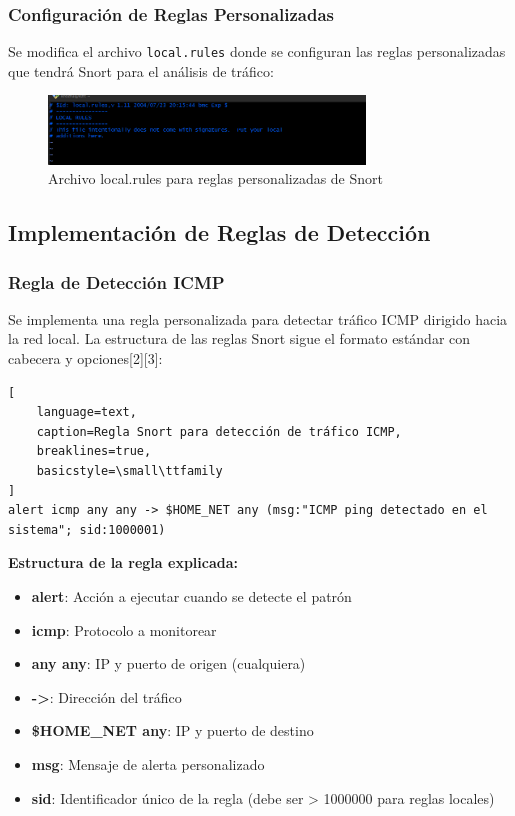 \documentclass[12pt,a4paper]{article}
\begin{document}
\subsubsection{Configuración de Reglas Personalizadas}

Se modifica el archivo \texttt{local.rules} donde se configuran las reglas
personalizadas que tendrá Snort para el análisis de tráfico:

\begin{figure}[H]
  \centering
  \includegraphics[width=0.75\textwidth]{./assets/img14.png}
  \caption{Archivo local.rules para reglas personalizadas de Snort}
  \label{fig:local-rules}
\end{figure}

\subsection{Implementación de Reglas de Detección}

\subsubsection{Regla de Detección ICMP}

Se implementa una regla personalizada para detectar tráfico ICMP dirigido hacia
la red local. La estructura de las reglas Snort sigue el formato estándar con
cabecera y opciones[2][3]:

\begin{lstlisting}[
    language=text, 
    caption=Regla Snort para detección de tráfico ICMP,
    breaklines=true,
    basicstyle=\small\ttfamily
]
alert icmp any any -> $HOME_NET any (msg:"ICMP ping detectado en el sistema"; sid:1000001)
\end{lstlisting}

\textbf{Estructura de la regla explicada:}
\begin{itemize}
  \item \textbf{alert}: Acción a ejecutar cuando se detecte el patrón
  \item \textbf{icmp}: Protocolo a monitorear
  \item \textbf{any any}: IP y puerto de origen (cualquiera)
  \item \textbf{->}: Dirección del tráfico
  \item \textbf{\$HOME\_NET any}: IP y puerto de destino
  \item \textbf{msg}: Mensaje de alerta personalizado
  \item \textbf{sid}: Identificador único de la regla (debe ser > 1000000 para reglas locales)
\end{itemize}
\end{document}
